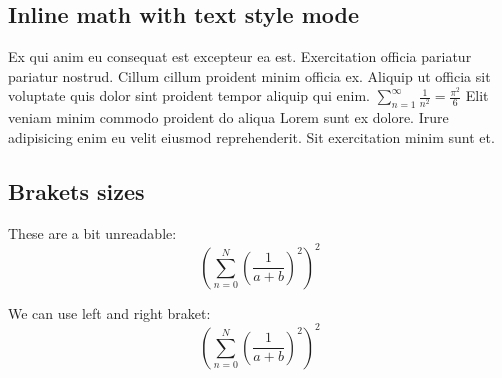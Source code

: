 \documentclass[12pt]{article}
\begin{document}
\subsection{Inline math with text style mode}

Ex qui anim eu consequat est excepteur ea est. Exercitation officia pariatur pariatur nostrud. Cillum cillum proident minim officia ex. Aliquip ut officia sit voluptate quis dolor sint proident tempor aliquip qui enim. $ \textstyle \sum_{n=1}^\infty \frac{1}{n^2} = \frac{\pi^2}{6} $ Elit veniam minim commodo proident do aliqua Lorem sunt ex dolore. Irure adipisicing enim eu velit eiusmod reprehenderit. Sit exercitation minim sunt et.

\subsection{Brakets sizes}

These are a bit unreadable:
\begin{equation*}
    ( \sum_{n=0}^N ( \frac{1}{a + b} )^2 )^2
\end{equation*}

\noindent We can use left and right braket:
\begin{equation*}
    \left( \sum_{n=0}^N \left( \frac{1}{a + b} \right)^2 \right)^2
\end{equation*}

\newpage
\printbibliography
\end{document}
